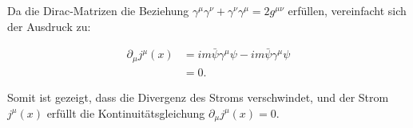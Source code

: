 Da die Dirac-Matrizen die Beziehung \(\gamma^\mu \gamma^\nu + \gamma^\nu \gamma^\mu = 2g^{\mu\nu}\) erfüllen, vereinfacht sich der Ausdruck zu:

\begin{align*}
\partial_\mu j^\mu(x) &= i m \bar{\psi} \gamma^\mu \psi - i m \bar{\psi} \gamma^\mu \psi \\
&= 0.
\end{align*}

Somit ist gezeigt, dass die Divergenz des Stroms verschwindet, und der Strom \( j^\mu(x) \) erfüllt die Kontinuitätsgleichung \(\partial_\mu j^\mu(x) = 0\).

